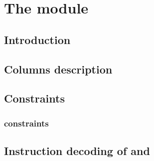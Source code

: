 \def\es                         {\col{INV.}}
\def\ip                         {\col{PUSH4}}
\def\pe                         {\col{PUSH18}}
\def\gz                         {{\color{gray!60}\mathtt{0x\,0}}}	
\def\qmda                       {{\color{gray!60}\overset{\displaystyle\vdots}?}} %
\def\qmdb                       {{\color{gray!60}\underset{\displaystyle\vdots}?}} %

\section{The \romMod{} module}
\subsection{Introduction}                             
\subsection{Columns description}                      
\subsection{Constraints}





\subsubsection{\nBytes{} constraints}                                                                   




\subsection{Instruction decoding of  and } \label{rom: instruction decoding} 
